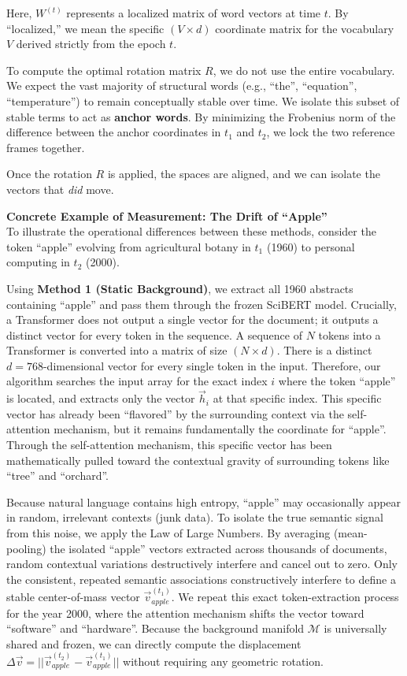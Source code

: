Here, $W^{(t)}$ represents a localized matrix of word vectors at time $t$. By ``localized,'' we mean the specific $(V \times d)$ coordinate matrix for the vocabulary $V$ derived strictly from the epoch $t$.

To compute the optimal rotation matrix $R$, we do not use the entire vocabulary. We expect the vast majority of structural words (e.g., ``the'', ``equation'', ``temperature'') to remain conceptually stable over time. We isolate this subset of stable terms to act as \textbf{anchor words}. By minimizing the Frobenius norm of the difference between the anchor coordinates in $t_1$ and $t_2$, we lock the two reference frames together.

Once the rotation $R$ is applied, the spaces are aligned, and we can isolate the vectors that \textit{did} move.



\textbf{Concrete Example of Measurement: The Drift of ``Apple''} \\
To illustrate the operational differences between these methods, consider the token ``apple'' evolving from agricultural botany in $t_1$ (1960) to personal computing in $t_2$ (2000).

Using \textbf{Method 1 (Static Background)}, we extract all 1960 abstracts containing ``apple'' and pass them through the frozen SciBERT model. Crucially, a Transformer does not output a single vector for the document; it outputs a distinct vector for every token in the sequence.
A sequence of $N$ tokens into a Transformer is converted into a matrix of size $(N \times d)$. There is a distinct $d=768$-dimensional vector for every single token in the input. Therefore, our algorithm searches the input array for the exact index $i$ where the token ``apple'' is located, and extracts only the vector $\vec{h}_i$ at that specific index. This specific vector has already been ``flavored'' by the surrounding context via the self-attention mechanism, but it remains fundamentally the coordinate for ``apple''.
Through the self-attention mechanism, this specific vector has been mathematically pulled toward the contextual gravity of surrounding tokens like ``tree'' and ``orchard''.

Because natural language contains high entropy, ``apple'' may occasionally appear in random, irrelevant contexts (junk data). To isolate the true semantic signal from this noise, we apply the Law of Large Numbers. By averaging (mean-pooling) the isolated ``apple'' vectors extracted across thousands of documents, random contextual variations destructively interfere and cancel out to zero. Only the consistent, repeated semantic associations constructively interfere to define a stable center-of-mass vector $\vec{v}_{apple}^{(t_1)}$. We repeat this exact token-extraction process for the year 2000, where the attention mechanism shifts the vector toward ``software'' and ``hardware''. Because the background manifold $\mathcal{M}$ is universally shared and frozen, we can directly compute the displacement $\Delta \vec{v} = ||\vec{v}_{apple}^{(t_2)} - \vec{v}_{apple}^{(t_1)}||$ without requiring any geometric rotation.

